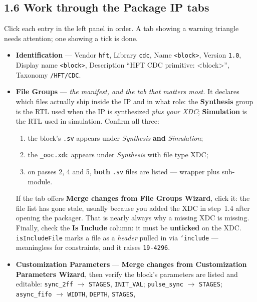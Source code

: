 \documentclass[10pt,a4paper]{article}
\newcommand{\code}[1]{\texttt{\small #1}}
\begin{document}
\subsection{1.6 Work through the Package IP tabs}

Click each entry in the left panel in order. A tab showing a warning triangle needs
attention; one showing a tick is done.

\begin{itemize}[leftmargin=1.2em, itemsep=2pt]
\item \textbf{Identification} --- Vendor \code{hft}, Library \code{cdc}, Name
  \code{<block>}, Version \code{1.0}, Display name \code{<block>}, Description
  ``HFT CDC primitive: <block>'', Taxonomy \code{/HFT/CDC}.
\item \textbf{File Groups} --- \emph{the manifest, and the tab that matters most.}
  It declares which files actually ship inside the IP and in what role: the
  \textbf{Synthesis} group is the RTL used when the IP is synthesized \emph{plus
  your XDC}; \textbf{Simulation} is the RTL used in simulation. Confirm all three:
  \begin{enumerate}[leftmargin=1.4em, itemsep=0pt, topsep=2pt, label=(\alph*)]
  \item the block's \code{.sv} appears under \emph{Synthesis} \textbf{and}
    \emph{Simulation};
  \item the \code{\_ooc.xdc} appears under \emph{Synthesis} with file type XDC;
  \item on passes 2, 4 and 5, \textbf{both} \code{.sv} files are listed --- wrapper
    plus sub-module.
  \end{enumerate}
  If the tab offers \textbf{Merge changes from File Groups Wizard}, click it: the
  file list has gone stale, usually because you added the XDC in step~1.4 after
  opening the packager. That is nearly always why a missing XDC is missing.
  \\[2pt]
  Finally, check the \textbf{Is Include} column: it must be \textbf{unticked} on the
  XDC. \code{isIncludeFile} marks a file as a \emph{header} pulled in via
  \code{`include} --- meaningless for constraints, and it raises
  \code{19-4296}.
\item \textbf{Customization Parameters} --- \textbf{Merge changes from Customization
  Parameters Wizard}, then verify the block's parameters are listed and editable:
  \code{sync\_2ff} $\to$ \code{STAGES}, \code{INIT\_VAL};
  \code{pulse\_sync} $\to$ \code{STAGES};
  \code{async\_fifo} $\to$ \code{WIDTH}, \code{DEPTH}, \code{STAGES},

\end{itemize}
\end{document}
